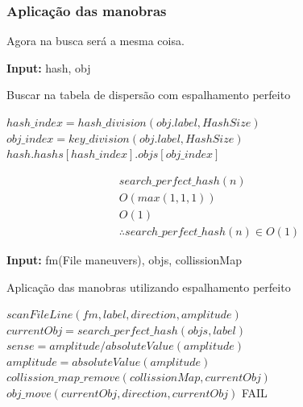 \documentclass[11pt]{article}
\begin{document}
\subsubsection{Aplicação das manobras}
\label{sec:orgb699169}
Agora na busca será a mesma coisa.

\begin{algorithm}
\textbf{Input:} hash, obj
\caption{Buscar na tabela de dispersão com espalhamento perfeito}\label{algorithmdpsmudar}
\begin{algorithmic}[1]
\State $hash\_index = hash\_division(obj.label,HashSize)$
\State $obj\_index = key\_division(obj.label,HashSize)$
\State \Return $hash.hashs[hash\_index].objs[obj\_index]$
\EndProcedure
\end{algorithmic}
\end{algorithm}

\begin{equation}
\begin{aligned}
search\_perfect\_hash(n)\\
O(max(1,1,1))\\
O(1)\\
\therefore search\_perfect\_hash(n) \in O(1)
\end{aligned}
\end{equation}


\begin{algorithm}
\textbf{Input:} fm(File maneuvers), objs, collissionMap
\caption{Aplicação das manobras utilizando espalhamento perfeito}\label{algorithmdpsmudar}
\begin{algorithmic}[1]
      \State $scanFileLine(fm,label,direction,amplitude)$
      \State $currentObj = search\_perfect\_hash(objs,label)$
      \State $sense = amplitude/absoluteValue(amplitude)$
      \State $amplitude = absoluteValue(amplitude)$
      \State $collission\_map\_remove(collissionMap,currentObj)$
      \State $obj\_move(currentObj,direction,currentObj)$
      \State \Return FAIL
      \EndIf
      \EndFor
\EndWhile
\EndProcedure
\end{algorithmic}
\end{algorithm}
\end{document}
